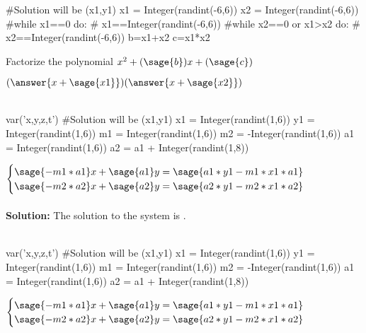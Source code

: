 \documentclass{ximera}
\begin{document}
\begin{shuffle}
\begin{question}
\begin{sagesilent}
#Solution will be (x1,y1)
x1 = Integer(randint(-6,6))
x2 = Integer(randint(-6,6))
#while x1==0 do:
#    x1==Integer(randint(-6,6))
#while x2==0 or x1>x2 do:
#    x2==Integer(randint(-6,6))
b=x1+x2
c=x1*x2
\end{sagesilent}

Factorize the polynomial $x^2+(\sage{b})x+(\sage{c})$

$(\answer{x+\sage{x1}})(\answer{x+\sage{x2}})$\\\\

\end{question}
\begin{question}
\begin{sagesilent}
var('x,y,z,t')
#Solution will be (x1,y1)
x1 = Integer(randint(1,6))
y1 = Integer(randint(1,6))
m1 = Integer(randint(1,6))
m2 = -Integer(randint(1,6)) 
a1 = Integer(randint(1,6))
a2 = a1 + Integer(randint(1,8))
\end{sagesilent}
$\begin{cases}
\sage{-m1*a1}x+\sage{a1}y=\sage{a1*y1-m1*x1*a1}\\
\sage{-m2*a2}x+\sage{a2}y=\sage{a2*y1-m2*x1*a2}\\
\end{cases}$\\\\

{\bf Solution:} The solution to the system is 
.\\\\
\end{question}

\begin{question}
\begin{sagesilent}
var('x,y,z,t')
#Solution will be (x1,y1)
x1 = Integer(randint(1,6))
y1 = Integer(randint(1,6))
m1 = Integer(randint(1,6))
m2 = -Integer(randint(1,6)) 
a1 = Integer(randint(1,6))
a2 = a1 + Integer(randint(1,8))
\end{sagesilent}
$\begin{cases}
\sage{-m1*a1}x+\sage{a1}y=\sage{a1*y1-m1*x1*a1}\\
\sage{-m2*a2}x+\sage{a2}y=\sage{a2*y1-m2*x1*a2}\\
\end{cases}$\\\\


\end{question}
\end{shuffle}
\end{document}
